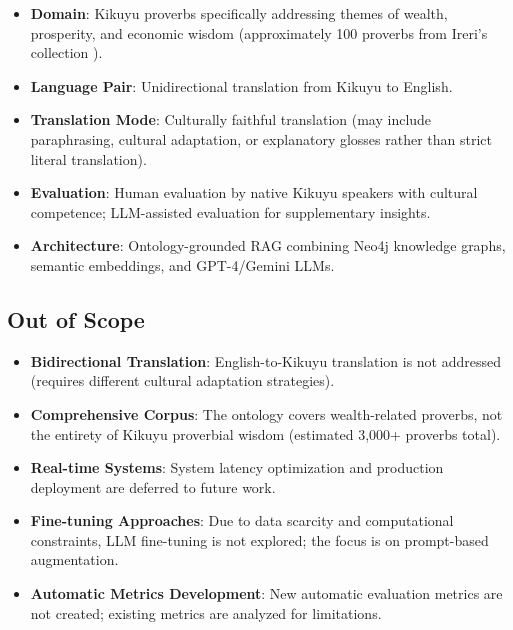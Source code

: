 \begin{itemize}
    \item \textbf{Domain}: Kikuyu proverbs specifically addressing themes of wealth, prosperity, and economic wisdom (approximately 100 proverbs from Ireri's collection \cite{ireri2019proverbs}).
    
    \item \textbf{Language Pair}: Unidirectional translation from Kikuyu to English.
    
    \item \textbf{Translation Mode}: Culturally faithful translation (may include paraphrasing, cultural adaptation, or explanatory glosses rather than strict literal translation).
    
    \item \textbf{Evaluation}: Human evaluation by native Kikuyu speakers with cultural competence; LLM-assisted evaluation for supplementary insights.
    
    \item \textbf{Architecture}: Ontology-grounded RAG combining Neo4j knowledge graphs, semantic embeddings, and GPT-4/Gemini LLMs.
\end{itemize}

\subsection{Out of Scope}
\label{subsec:out_scope}

\begin{itemize}
    \item \textbf{Bidirectional Translation}: English-to-Kikuyu translation is not addressed (requires different cultural adaptation strategies).
    
    \item \textbf{Comprehensive Corpus}: The ontology covers wealth-related proverbs, not the entirety of Kikuyu proverbial wisdom (estimated 3,000+ proverbs total).
    
    \item \textbf{Real-time Systems}: System latency optimization and production deployment are deferred to future work.
    
    \item \textbf{Fine-tuning Approaches}: Due to data scarcity and computational constraints, LLM fine-tuning is not explored; the focus is on prompt-based augmentation.
    
    \item \textbf{Automatic Metrics Development}: New automatic evaluation metrics are not created; existing metrics are analyzed for limitations.
\end{itemize}

